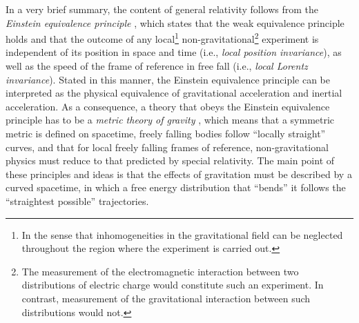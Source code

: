 \documentclass[
12pt,		%
openright,	%
twoside,  %
a4paper,			%
chapter=TITLE,		%
english,			%
french,				%
spanish,			%
brazil				%
]{USPSC-classe/USPSC}
\begin{document}
In a very brief summary, the content of general relativity follows from the \textit{Einstein equivalence principle} \cite{Will2018}, which states that the weak equivalence principle holds and that the outcome of any local\footnote{In the sense that inhomogeneities in the gravitational field can be neglected throughout the region where the experiment is carried out.} non-gravitational\footnote{The measurement of the electromagnetic interaction between two distributions of electric charge would constitute such an experiment. In contrast, measurement of the gravitational interaction between such distributions would not.} experiment is independent of its position in space and time (i.e., \textit{local position invariance}), as well as the speed of the frame of reference in free fall (i.e., \textit{local Lorentz invariance}). Stated in this manner, the Einstein equivalence principle can be interpreted as the physical equivalence of gravitational acceleration and inertial acceleration. As a consequence, a theory that obeys the Einstein equivalence principle has to be a \textit{metric theory of gravity} \cite{Will2014}, which means that a symmetric metric is defined on spacetime, freely falling bodies follow ``locally straight'' curves, and that for local freely falling frames of reference, non-gravitational physics must reduce to that predicted by special relativity. The main point of these principles and ideas is that the effects of gravitation must be described by a curved spacetime, in which a free energy distribution that ``bends'' it follows the ``straightest possible'' trajectories.
\end{document}
